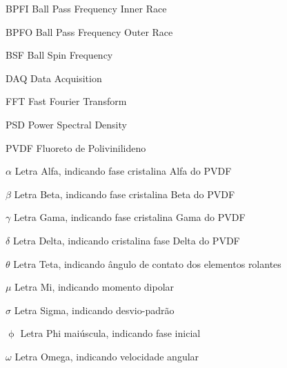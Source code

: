 \documentclass[
	12pt,				
	oneside,			
	a4paper,			
	english,			
	brazil,			
	]{abntex2ppgsi}
\begin{document}
\listoffigures*
\cleardoublepage
\listoftables*
\cleardoublepage




%
%
\begin{siglas}
  \item[BPFI] Ball Pass Frequency Inner Race
  \item[BPFO] Ball Pass Frequency Outer Race
  \item[BSF] Ball Spin Frequency 
  \item[DAQ] Data Acquisition
  \item[FFT] Fast Fourier Transform
  \item[PSD] Power Spectral Density
  \item[PVDF] Fluoreto de Polivinilideno
\end{siglas}


\begin{simbolos}
  \item[$ \alpha $] Letra Alfa, indicando fase cristalina Alfa do PVDF
  \item[$ \beta $] Letra Beta, indicando fase cristalina Beta do PVDF
  \item[$ \gamma $] Letra Gama, indicando fase cristalina Gama do PVDF
  \item[$ \delta $] Letra Delta, indicando cristalina fase Delta do PVDF
  \item[$ \theta $] Letra Teta, indicando ângulo de contato dos elementos rolantes
  \item[$ \mu $] Letra Mi, indicando momento dipolar 
  \item[$ \sigma $] Letra Sigma, indicando desvio-padrão
  \item[$ \upphi $] Letra Phi maiúscula, indicando fase inicial
  \item[$ \omega $] Letra Omega, indicando velocidade angular 
\end{simbolos}
\end{document}
